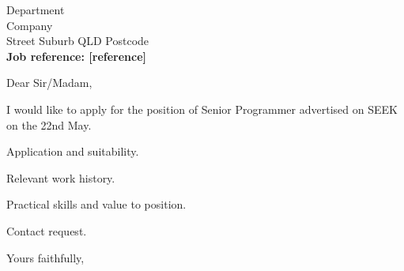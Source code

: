 \documentclass{letter}
\begin{document}
\begin{letter}{Department\\Company\Street\\Street Suburb QLD Postcode\\[\parskip]
\textbf{Job reference: [reference]}}

\opening{Dear Sir/Madam,}

I would like to apply for the position of Senior Programmer advertised on SEEK on the 22nd May. 

Application and suitability.

Relevant work history.

Practical skills and value to position.

Contact request.

\closing{Yours faithfully,}

\end{letter}
\end{document}
